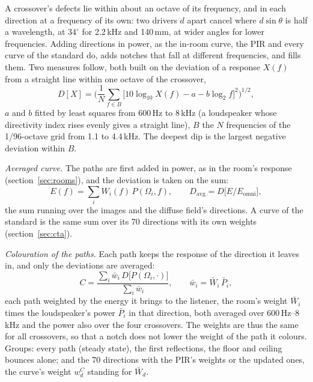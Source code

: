 \documentclass[11pt,a4paper]{article}
\begin{document}
A crossover's defects lie within about an octave of its frequency, and in each direction at a
frequency of its own: two drivers $d$ apart cancel where $d \sin\theta$ is half a wavelength, at
$34^\circ$ for 2.2\,kHz and 140\,mm, at wider angles for lower frequencies. Adding directions in
power, as the in-room curve, the PIR and every curve of the standard do, adds notches that fall at
different frequencies, and fills them. Two measures follow, both built on the deviation of a response
$X(f)$ from a straight line within one octave of the crossover,
\begin{equation}
D[X] = \bigg(\frac{1}{N}\sum_{f \in B}\Big[10\log_{10} X(f) - a - b\log_2 f\Big]^2\bigg)^{1/2},
\end{equation}
$a$ and $b$ fitted by least squares from 600\,Hz to 8\,kHz (a loudspeaker whose directivity index rises
evenly gives a straight line), $B$ the $N$ frequencies of the 1/96-octave grid from 1.1 to 4.4\,kHz. The
deepest dip is the largest negative deviation within $B$.

\emph{Averaged curve.} The paths are first added in power, as in the room's response
(section~\ref{sec:rooms}), and the deviation is taken on the sum:
\begin{equation}
E(f) = \sum_i W_i(f)\,P(\Omega_i, f), \qquad D_{\mathrm{avg}} = D\big[E / E_{\mathrm{omni}}\big],
\end{equation}
the sum running over the images and the diffuse field's directions. A curve of the standard is the
same sum over its 70 directions with its own weights (section~\ref{sec:cta}).

\emph{Colouration of the paths.} Each path keeps the response of the direction it leaves in, and only
the deviations are averaged:
\begin{equation}
C = \frac{\sum_i \bar w_i\,D\big[P(\Omega_i, \cdot)\big]}{\sum_i \bar w_i}, \qquad
\bar w_i = \bar W_i\,\bar P_i,
\end{equation}
each path weighted by the energy it brings to the listener, the room's weight $\bar W_i$ times the
loudspeaker's power $\bar P_i$ in that direction, both averaged over 600\,Hz--8\,kHz and the power also
over the four crossovers. The weights are thus the same for all crossovers, so that a notch does not
lower the weight of the path it colours. Groups: every path (steady state), the first reflections, the
floor and ceiling bounces alone; and the 70 directions with the PIR's weights or the updated ones, the
curve's weight $w^C_d$ standing for $\bar W_d$.
\end{document}
